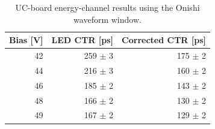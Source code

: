 \begin{table}[htbp]
\centering
\small
\begin{tabular}{rrr}
\toprule
Bias [V] & LED CTR [ps] & Corrected CTR [ps] \\
\midrule
42 & 259 $\pm$ 3 & 175 $\pm$ 2 \\
44 & 216 $\pm$ 3 & 160 $\pm$ 2 \\
46 & 185 $\pm$ 2 & 143 $\pm$ 2 \\
48 & 166 $\pm$ 2 & 130 $\pm$ 2 \\
49 & 167 $\pm$ 2 & 129 $\pm$ 2 \\
\bottomrule
\end{tabular}
\caption{UC-board energy-channel results using the Onishi waveform window.}
\label{tab:uc-energy-onishi}
\end{table}
